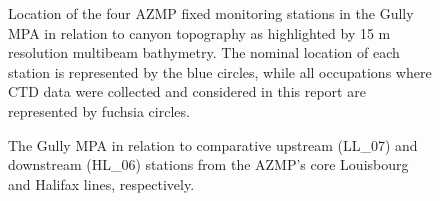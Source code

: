 \documentclass[12pt]{article}\usepackage[]{graphicx}\usepackage[]{color}
\begin{document}
\clearpage


\begin{figure}[htb]

{\centering {} 

}

\caption{Location of the four AZMP fixed monitoring stations in the Gully MPA in relation to canyon topography as highlighted by 15 m resolution multibeam bathymetry. The nominal location of each station is represented by the blue circles, while all occupations where CTD data were collected and considered in this report are represented by fuchsia circles.}\label{fig:figure2}
\end{figure}
\clearpage


\begin{figure}[htb]

{\centering {} 

}

\caption{The Gully MPA in relation to comparative upstream (LL\_07) and downstream (HL\_06) stations from the AZMP's core Louisbourg and Halifax lines, respectively.}\label{fig:figure3}
\end{figure}
\clearpage
\end{document}
